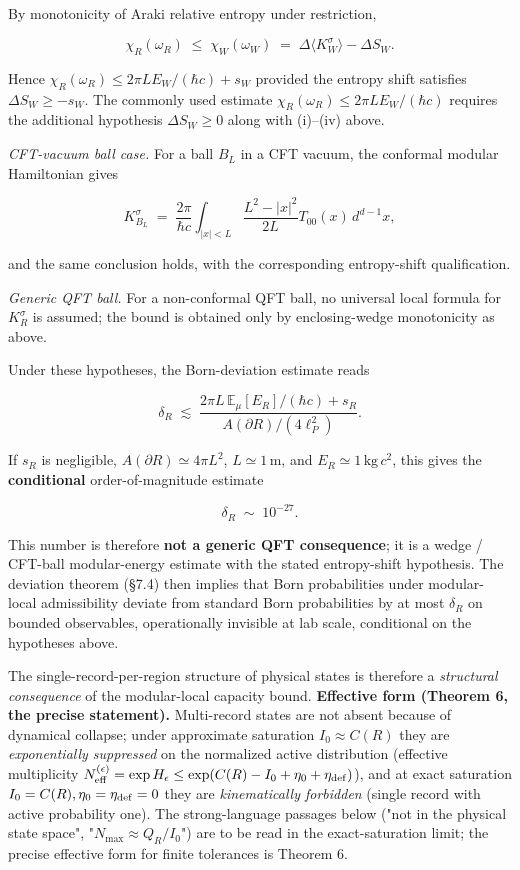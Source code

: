 \documentclass[11pt,a4paper]{article}
\begin{document}
By monotonicity of Araki relative entropy under restriction,

\[
\chi_R(\omega_R) \;\le\; \chi_W(\omega_W) \;=\; \Delta\langle K_W^\sigma\rangle - \Delta S_W.
\]

Hence $\chi_R(\omega_R) \le 2\pi L E_W/(\hbar c) + s_W$ provided the entropy shift satisfies $\Delta S_W \ge -s_W$. The commonly used estimate $\chi_R(\omega_R) \le 2\pi L E_W/(\hbar c)$ requires the additional hypothesis $\Delta S_W \ge 0$ along with (i)–(iv) above.

\emph{CFT-vacuum ball case.} For a ball $B_L$ in a CFT vacuum, the conformal modular Hamiltonian gives

\[
K_{B_L}^\sigma \;=\; \frac{2\pi}{\hbar c} \int_{|x| < L} \frac{L^2 - |x|^2}{2L} T_{00}(x) \, d^{d-1}x,
\]

and the same conclusion holds, with the corresponding entropy-shift qualification.

\emph{Generic QFT ball.} For a non-conformal QFT ball, no universal local formula for $K_R^\sigma$ is assumed; the bound is obtained only by enclosing-wedge monotonicity as above.

Under these hypotheses, the Born-deviation estimate reads

\[
\delta_R \;\lesssim\; \frac{2\pi L \, \mathbb{E}_\mu[E_R]/(\hbar c) + s_R}{A(\partial R)/(4\ell_P^2)}.
\]

If $s_R$ is negligible, $A(\partial R) \simeq 4\pi L^2$, $L \simeq 1\,\mathrm{m}$, and $E_R \simeq 1\,\mathrm{kg}\,c^2$, this gives the \textbf{conditional} order-of-magnitude estimate

\[
\delta_R \;\sim\; 10^{-27}.
\]

This number is therefore \textbf{not a generic QFT consequence}; it is a wedge / CFT-ball modular-energy estimate with the stated entropy-shift hypothesis. The deviation theorem (§7.4) then implies that Born probabilities under modular-local admissibility deviate from standard Born probabilities by at most $\delta_R$ on bounded observables, operationally invisible at lab scale, conditional on the hypotheses above.

The single-record-per-region structure of physical states is therefore a \emph{structural consequence} of the modular-local capacity bound. \textbf{Effective form (Theorem 6, the precise statement).} Multi-record states are not absent because of dynamical collapse; under approximate saturation $I_0 \approx C(R)$ they are \emph{exponentially suppressed} on the normalized active distribution (effective multiplicity $N^{(\epsilon)}_{\rm eff} = \exp H_\epsilon \le \exp(C(R) - I_0 + \eta_0 + \eta_{\rm def})$), and at exact saturation $I_0 = C(R), \eta_0 = \eta_{\rm def} = 0$ they are \emph{kinematically forbidden} (single record with active probability one). The strong-language passages below ("not in the physical state space", "$N_{\max} \approx Q_R/I_0$") are to be read in the exact-saturation limit; the precise effective form for finite tolerances is Theorem 6.
\end{document}

